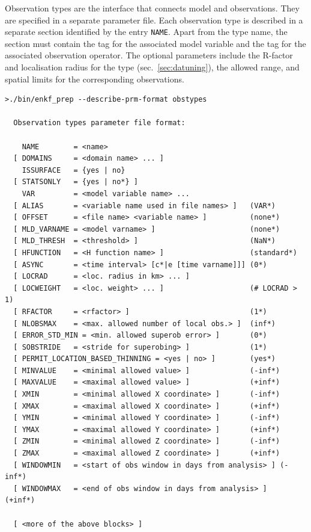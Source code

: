 \documentclass[11pt]{report}
\begin{document}
Observation types are the interface that connects model and observations.
They are specified in a separate parameter file.
Each observation type is described in a separate section identified by the entry \verb|NAME|.
Apart from the type name, the section must contain the tag for the associated model variable and the tag for the associated observation operator.
The optional parameters include the R-factor and localisation radius for the type (sec.~\ref{sec:datuning}), the allowed range, and spatial limits for the corresponding observations.
\begin{Verbatim}[frame=single,fontsize=\footnotesize]
>./bin/enkf_prep --describe-prm-format obstypes

  Observation types parameter file format:

    NAME        = <name>
  [ DOMAINS     = <domain name> ... ]
    ISSURFACE   = {yes | no}
  [ STATSONLY   = {yes | no*} ]
    VAR         = <model variable name> ...
  [ ALIAS       = <variable name used in file names> ]   (VAR*)
  [ OFFSET      = <file name> <variable name> ]          (none*)
  [ MLD_VARNAME = <model varname> ]                      (none*)
  [ MLD_THRESH  = <threshold> ]                          (NaN*)
  [ HFUNCTION   = <H function name> ]                    (standard*)
  [ ASYNC       = <time interval> [c*|e [time varname]]] (0*)
  [ LOCRAD      = <loc. radius in km> ... ]
  [ LOCWEIGHT   = <loc. weight> ... ]                    (# LOCRAD > 1)
  [ RFACTOR     = <rfactor> ]                            (1*)
  [ NLOBSMAX    = <max. allowed number of local obs.> ]  (inf*)
  [ ERROR_STD_MIN = <min. allowed superob error> ]       (0*)
  [ SOBSTRIDE   = <stride for superobing> ]              (1*)
  [ PERMIT_LOCATION_BASED_THINNING = <yes | no> ]        (yes*)
  [ MINVALUE    = <minimal allowed value> ]              (-inf*)
  [ MAXVALUE    = <maximal allowed value> ]              (+inf*)
  [ XMIN        = <minimal allowed X coordinate> ]       (-inf*)
  [ XMAX        = <maximal allowed X coordinate> ]       (+inf*)
  [ YMIN        = <minimal allowed Y coordinate> ]       (-inf*)
  [ YMAX        = <maximal allowed Y coordinate> ]       (+inf*)
  [ ZMIN        = <minimal allowed Z coordinate> ]       (-inf*)
  [ ZMAX        = <maximal allowed Z coordinate> ]       (+inf*)
  [ WINDOWMIN   = <start of obs window in days from analysis> ] (-inf*)
  [ WINDOWMAX   = <end of obs window in days from analysis> ]   (+inf*)

  [ <more of the above blocks> ]
\end{Verbatim}
\end{document}
